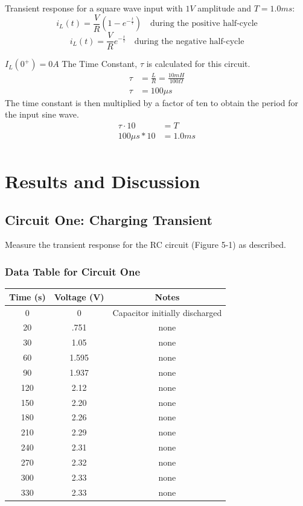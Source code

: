 \documentclass[12pt]{article}
\begin{document}
Transient response for a square wave input with $1V$ amplitude and $T = 1.0 ms$:
\[
	i_L(t) = \frac{V}{R}(1 - e^{-\frac{t}{\tau}}) \quad \text{during the positive half-cycle}
\]
\[
	i_L(t) = \frac{V}{R} e^{-\frac{t}{\tau}} \quad \text{during the negative half-cycle}
\]

$I_L(0^+) = 0A$
The Time Constant, $\tau$ is calculated for this circuit.
\begin{align*}
	\tau & = \frac{L}{R} = \frac{10mH}{100\Omega} \\
	\tau & = 100\mu s
\end{align*}
The time constant is then multiplied by a factor of ten to obtain the period for
the input sine wave.
\begin{align*}
	\tau \cdot 10 & = T      \\
	100\mu s * 10 & = 1.0 ms \\
\end{align*}
\section{Results and Discussion}
\subsection{Circuit One: Charging Transient}
Measure the transient response for the RC circuit (Figure 5-1) as described.

\subsubsection{Data Table for Circuit One}
\begin{tabular}{c|c|c}
	\hline
	Time (s) & Voltage (V) & Notes                          \\
	\hline
	0        & 0           & Capacitor initially discharged \\
	20       & .751        & none                           \\
	30       & 1.05        & none                           \\
	60       & 1.595       & none                           \\
	90       & 1.937       & none                           \\
	120      & 2.12        & none                           \\
	150      & 2.20        & none                           \\
	180      & 2.26        & none                           \\
	210      & 2.29        & none                           \\
	240      & 2.31        & none                           \\
	270      & 2.32        & none                           \\
	300      & 2.33        & none                           \\
	330      & 2.33        & none                           \\
\end{tabular}
\end{document}
